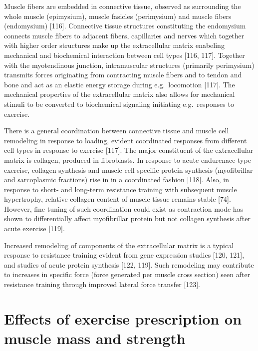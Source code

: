 \documentclass[twoside,10pt]{gihclass} %
\begin{document}
Muscle fibers are embedded in connective tissue, observed as surrounding the whole muscle (epimysium), muscle fasicles (perimysium) and muscle fibers (endomysium)
{[}116{]}.
Connective tissue structures constituting the endomysium connects muscle fibers to adjacent fibers, capillaries and nerves which together with higher order structures make up the extracellular matrix enabeling mechanical and biochemical interaction between cell types
{[}116, 117{]}.
Together with the myotendinous junction, intramuscular structures (primarily perimysium) transmits forces originating from contracting muscle fibers and to tendon and bone and act as an elastic energy storage during e.g.~locomotion
{[}117{]}.
The mechanical properties of the extracellular matrix also allows for mechanical stimuli to be converted to biochemical signaling initiating e.g.~responses to exercise.

There is a general coordination between connective tissue and muscle cell remodeling in response to loading, evident coordinated responses from different cell types in response to exercise
{[}117{]}.
The major constituent of the extracellular matrix is collagen, produced in fibroblasts.
In response to acute endurenace-type exercise, collagen synthesis and muscle cell specific protein synthesis (myofibrillar and sarcoplasmic fractions) rise in in a coordinated fashion
{[}118{]}.
Also, in response to short- and long-term resistance training with subsequent muscle hypertrophy, relative collagen content of muscle tissue remains stable
{[}74{]}.
However, fine tuning of such coordination could exist as contraction mode has shown to differentially affect myofibrillar protein but not collagen synthesis after acute exercise
{[}119{]}.

Increased remodeling of components of the extracellular matrix is a typical response to resistance training evident from gene expression studies
{[}120, 121{]},
and studies of acute protein synthesis
{[}122, 119{]}.
Such remodeling may contribute to increases in specific force (force generated per muscle cross section) seen after resistance training through improved lateral force transfer
{[}123{]}.

\hypertarget{effects-of-exercise-prescription-on-muscle-mass-and-strength}{%
\section{Effects of exercise prescription on muscle mass and strength}\label{effects-of-exercise-prescription-on-muscle-mass-and-strength}}
\end{document}
